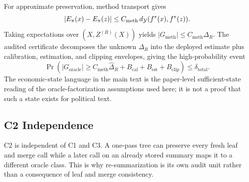 For approximate preservation, method transport gives
\[
|E_\pi(x)-E_\pi(z)|
\le C_{\mathrm{meth}}\,d_{\mathcal{Y}}(f^\ast(x),f^\ast(z)).
\]
Taking expectations over $(X,Z^{(R)}(X))$ yields
$|G_{\mathrm{meth}}|\le C_{\mathrm{meth}}\Delta_R$. The audited certificate
decomposes the unknown $\Delta_R$ into the deployed estimate plus calibration,
estimation, and clipping envelopes, giving the high-probability event
\[
\Pr\!\left(|G_{\mathrm{oracle}}|\ge
C_{\mathrm{meth}}\hat{\Delta}_R+B_{\mathrm{cal}}+B_{\mathrm{est}}+
B_{\mathrm{clip}}\right)\le\delta_{\mathrm{total}}.
\]
The economic-state language in the main text is the paper-level
sufficient-state reading of the oracle-factorization assumptions used
here; it is not a proof that such a state exists for political text.

\subsection{C2 Independence}

C2 is independent of C1 and C3. A one-pass tree can preserve every fresh leaf
and merge call while a later call on an already stored summary maps it to a
different oracle class. This is why re-summarization is its own audit unit
rather than a consequence of leaf and merge consistency.

